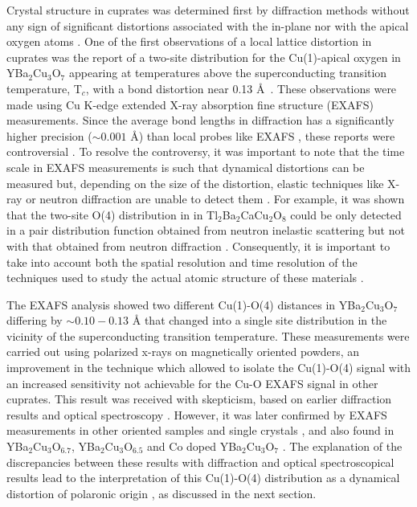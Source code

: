 Crystal structure in cuprates was determined first by diffraction methods without any sign of significant distortions associated with the in-plane nor with the apical oxygen atoms \cite{Capponi1987,Schafer1988}. 
One of the first observations of a local lattice distortion in cuprates was the report of a two-site distribution for the Cu(1)-apical oxygen in YBa$_{2}$Cu$_{3}$O$_{7}$ appearing at temperatures above the superconducting transition temperature, T$_{c}$, with a bond distortion near 0.13 \AA\ \cite{MustredeLeon1990,Conradson1990}.
These observations were made using Cu K-edge extended X-ray absorption fine structure (EXAFS) measurements.
Since the average bond lengths in diffraction has a significantly higher precision ($\sim 0.001$ \AA \cite{Miceli1988}) than local probes like EXAFS \cite{Rehr2000}, these reports were controversial \cite{Kwei1990}.
To resolve the controversy, it was important to note that the time scale in EXAFS measurements is such that dynamical distortions can be measured but, depending on the size of the distortion, elastic techniques like X-ray or neutron diffraction are unable to detect them \cite{Salkola1995}.
For example, it was shown that the two-site O(4) distribution in in Tl$_{2}$Ba$_{2}$CaCu$_{2}$O$_{8}$ could be only detected in a pair distribution function obtained from neutron inelastic scattering but not with that obtained from neutron diffraction \cite{Egami1991}. 
Consequently, it is important to take into account both the spatial resolution and time resolution of the techniques used to study the actual atomic structure of these materials \cite{Mihailovic2005}. 

The EXAFS analysis showed two different Cu(1)-O(4) distances in YBa$_2$Cu$_3$O$_7$ differing by $\sim 0.10-0.13$ \AA \cite{Conradson1990,MustredeLeon1992a} that changed into a single site distribution in the vicinity of the superconducting transition temperature. 
These measurements were carried out using polarized x-rays on magnetically oriented powders, an improvement in the technique which allowed to isolate the Cu(1)-O(4) signal with an increased sensitivity not achievable for the Cu-O EXAFS signal in other cuprates. 
This result was received with skepticism, based on earlier diffraction results \cite{battlog1992lattice,Kwei1990,Sharma1991} and optical spectroscopy \cite{Thomsen1993}. 
However, it was later confirmed by EXAFS measurements in other oriented samples \cite{Stern1993} and single crystals \cite{Booth1996}, and also found in YBa$_{2}$Cu$_{3}$O$_{6.7}$, YBa$_{2}$Cu$_{3}$O$_{6.5}$ and Co doped YBa$_{2}$Cu$_{3}$O$_{7}$ \cite{MustredeLeon1991}. 
The explanation of the discrepancies between these results with diffraction and optical spectroscopical results lead to the interpretation of this Cu(1)-O(4) distribution as a dynamical distortion of polaronic origin \cite{MustredeLeon1992}, as discussed in the next section.

